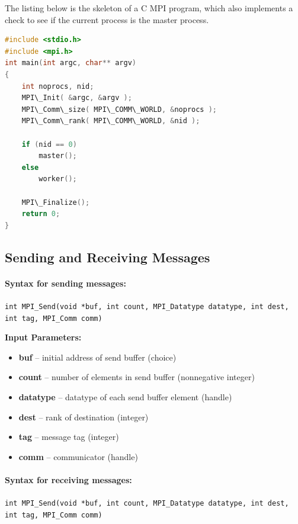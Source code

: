 \documentclass{article}
\begin{document}
The listing below is the skeleton of a C MPI program, which also implements a check to see if the current process is the master process.
\begin{lstlisting}[language=C,frame=single]
#include <stdio.h>
#include <mpi.h>
int main(int argc, char** argv)
{
	int noprocs, nid;
	MPI\_Init( &argc, &argv );
	MPI\_Comm\_size( MPI\_COMM\_WORLD, &noprocs );
	MPI\_Comm\_rank( MPI\_COMM\_WORLD, &nid );
	
	if (nid == 0)
		master();
	else
		worker();	
	
	MPI\_Finalize();
	return 0;
}
\end{lstlisting}

\subsection{Sending and Receiving Messages}

\paragraph{Syntax for sending messages:}
\texttt{int MPI\_Send(void *buf, int count, MPI\_Datatype datatype, int dest, int tag, MPI\_Comm comm)}

\textbf{Input Parameters:}
\begin{itemize}
	\item \textbf{buf} -- initial address of send buffer (choice)
	\item \textbf{count} -- number of elements in send buffer (nonnegative integer)
	\item \textbf{datatype} -- datatype of each send buffer element (handle)
	\item \textbf{dest} -- rank of destination (integer)
	\item \textbf{tag} -- message tag (integer)
	\item \textbf{comm} -- communicator (handle)
\end{itemize}

\paragraph{Syntax for receiving messages:}
\texttt{int MPI\_Send(void *buf, int count, MPI\_Datatype datatype, int dest, int tag, MPI\_Comm comm)}
\end{document}
